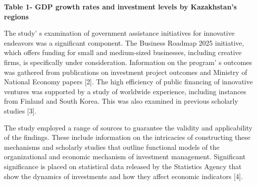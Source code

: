 
{\bfseries Table 1- GDP growth rates and investment levels by Kazakhstan's
regions}

The study' s examination of government assistance
initiatives for innovative endeavors was a significant component. The
Business Roadmap 2025 initiative, which offers funding for small and
medium-sized businesses, including creative firms, is specifically under
consideration. Information on the program' s outcomes was
gathered from publications on investment project outcomes and Ministry
of National Economy papers {[}2{]}. The high efficiency of public
financing of innovative ventures was supported by a study of worldwide
experience, including instances from Finland and South Korea. This was
also examined in previous scholarly studies {[}3{]}.

The study employed a range of sources to guarantee the validity and
applicability of the findings. These include information on the
intricacies of constructing these mechanisms and scholarly studies that
outline functional models of the organizational and economic mechanism
of investment management. Significant significance is placed on
statistical data released by the Statistics Agency that show the
dynamics of investments and how they affect economic indicators {[}4{]}.

